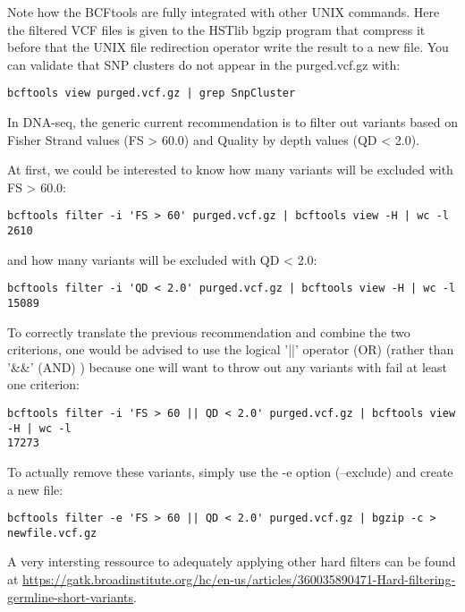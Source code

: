 Note how the BCFtools are fully integrated with other UNIX commands. Here the filtered VCF files is given to the HSTlib bgzip program that compress it before that the UNIX file redirection operator write the result to a new file. You can validate that SNP clusters do not appear in the purged.vcf.gz with:


\begin{verbatim}
bcftools view purged.vcf.gz | grep SnpCluster
\end{verbatim}

In DNA-seq, the generic current recommendation is to filter out variants based on Fisher Strand values (FS > 60.0) and Quality by depth values (QD < 2.0).

At first, we could be interested to know how many variants will be excluded with FS > 60.0:

\begin{verbatim}
bcftools filter -i 'FS > 60' purged.vcf.gz | bcftools view -H | wc -l
2610
\end{verbatim}

and how many variants will be excluded with QD < 2.0:

\begin{verbatim}
bcftools filter -i 'QD < 2.0' purged.vcf.gz | bcftools view -H | wc -l
15089
\end{verbatim}


To correctly translate the previous recommendation and combine the two criterions, one would be advised to use the logical '||' operator (OR) (rather than '\&\&' (AND) ) because one will want to throw out any variants with fail at least one criterion:

\begin{verbatim}
bcftools filter -i 'FS > 60 || QD < 2.0' purged.vcf.gz | bcftools view -H | wc -l
17273
\end{verbatim}


To actually remove these variants, simply use the -e option (--exclude) and create a new file:

\begin{verbatim}
bcftools filter -e 'FS > 60 || QD < 2.0' purged.vcf.gz | bgzip -c > newfile.vcf.gz
\end{verbatim}


A very intersting ressource to adequately applying other hard filters can be found at \href{https://gatk.broadinstitute.org/hc/en-us/articles/360035890471-Hard-filtering-germline-short-variants}{https://gatk.broadinstitute.org/hc/en-us/articles/360035890471-Hard-filtering-germline-short-variants}.




